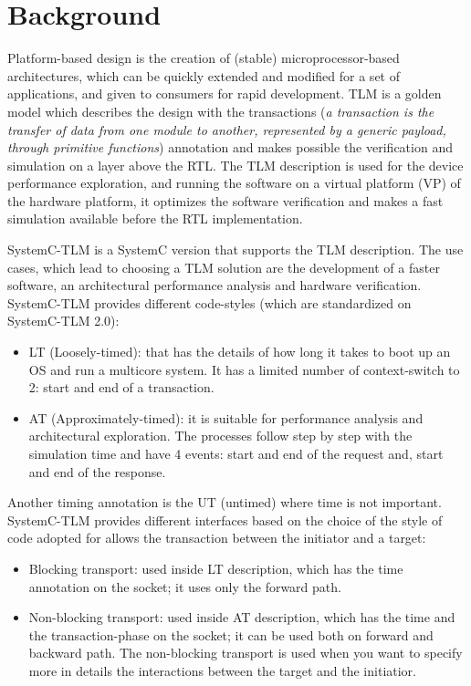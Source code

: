 \documentclass[]{IEEEtran}
\begin{document}
	\section{Background}
	\label{sec:Background}
	Platform-based design is the creation of (stable) microprocessor-based architectures, which can be quickly extended and modified for a set of applications, and given to consumers for rapid development. TLM is a golden model  which describes the design with the transactions (\textit{a transaction is the transfer of data from one module to another, represented by a generic payload, through primitive functions}) annotation and makes possible the verification and simulation on a layer above the RTL. 
	The TLM description is used for the device performance exploration, and running the software on a virtual platform (VP) of the hardware platform, it optimizes the software verification and makes a fast simulation available before the RTL implementation.
	
	SystemC-TLM \cite{SystemC-TLM} is a SystemC version that supports the TLM description. The use cases, which lead to choosing a TLM solution are the development of a faster software, an architectural performance analysis and hardware verification.
	SystemC-TLM provides different code-styles (which are standardized on SystemC-TLM 2.0):
	\begin{itemize}
		\item LT (Loosely-timed):  that has the details of how long it takes to boot up an OS and run a multicore system. It has a limited number of context-switch to 2: start and end of a transaction.
		\item AT (Approximately-timed): it is suitable for performance analysis and architectural exploration. The processes follow step by step with the simulation time and have 4 events: start and end of the request and, start and end of the response.
	\end{itemize}
	Another timing annotation is the UT (untimed) where time is not important.
	SystemC-TLM provides different interfaces based on the choice of the style of code adopted for allows the transaction between the initiator and a target:
	\begin{itemize}
		\item Blocking transport: used inside LT description, which has the time annotation on the socket; it uses only the forward path.
		\item Non-blocking transport: used inside AT description, which has the time and the transaction-phase on the socket; it can be used both on forward and backward path. The non-blocking transport is used when you want to specify more in details the interactions between the target and the initiatior.
	\end{itemize}
\end{document}
